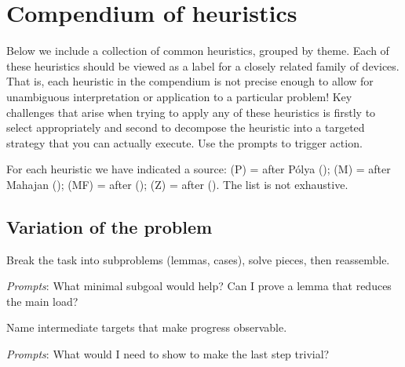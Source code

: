 \documentclass[
  a4paper,
  DIV=11,
  numbers=noendperiod,
  oneside]{scrreprt}
\begin{document}
\section{Compendium of heuristics}\label{compendium-of-heuristics}

Below we include a collection of common heuristics, grouped by theme.
Each of these heuristics should be viewed as a label for a closely
related family of devices. That is, each heuristic in the compendium is
not precise enough to allow for unambiguous interpretation or
application to a particular problem! Key challenges that arise when
trying to apply any of these heuristics is firstly to select
appropriately and second to decompose the heuristic into a targeted
strategy that you can actually execute. Use the prompts to trigger
action.

For each heuristic we have indicated a source: (P) = after Pólya
(); (M) = after Mahajan
(); (MF) = after
();
(Z) = after (). The list is not
exhaustive.

\subsection*{Variation of the problem}\label{variation-of-the-problem}

\begin{tcolorbox}[enhanced jigsaw, colbacktitle=quarto-callout-note-color!10!white, left=2mm, colback=white, rightrule=.15mm, toprule=.15mm, bottomrule=.15mm, colframe=quarto-callout-note-color-frame, bottomtitle=1mm, opacityback=0, toptitle=1mm, titlerule=0mm, coltitle=black, breakable, title={Decomposing and recombining (P, Z)}, arc=.35mm, opacitybacktitle=0.6, leftrule=.75mm]

Break the task into subproblems (lemmas, cases), solve pieces, then
reassemble.

\emph{Prompts}: What minimal subgoal would help? Can I prove a lemma
that reduces the main load?

\end{tcolorbox}

\begin{tcolorbox}[enhanced jigsaw, colbacktitle=quarto-callout-note-color!10!white, left=2mm, colback=white, rightrule=.15mm, toprule=.15mm, bottomrule=.15mm, colframe=quarto-callout-note-color-frame, bottomtitle=1mm, opacityback=0, toptitle=1mm, titlerule=0mm, coltitle=black, breakable, title={Establishing and using subgoals (P, Z)}, arc=.35mm, opacitybacktitle=0.6, leftrule=.75mm]

Name intermediate targets that make progress observable.

\emph{Prompts}: What would I need to show to make the last step trivial?

\end{tcolorbox}
\end{document}
